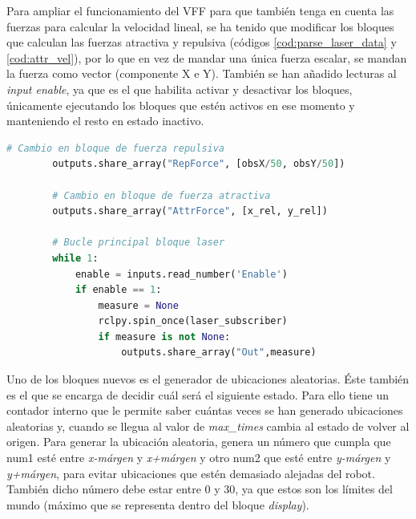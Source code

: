 Para ampliar el funcionamiento del VFF para que también tenga en cuenta las fuerzas para calcular la velocidad lineal, se ha tenido que modificar los bloques que calculan las
fuerzas atractiva y repulsiva (códigos \ref{cod:parse_laser_data} y \ref{cod:attr_vel}), por lo que en vez de mandar una única fuerza escalar, se mandan la fuerza como
vector (componente X e Y). También se han añadido lecturas al \textit{input enable}, ya que es el que habilita activar y desactivar los bloques, únicamente ejecutando
los bloques que estén activos en ese momento y manteniendo el resto en estado inactivo.

\begin{code}[H]
    \begin{lstlisting}[language=python]
        # Cambio en bloque de fuerza repulsiva
        outputs.share_array("RepForce", [obsX/50, obsY/50])

        # Cambio en bloque de fuerza atractiva
        outputs.share_array("AttrForce", [x_rel, y_rel])

        # Bucle principal bloque laser
        while 1:
            enable = inputs.read_number('Enable')
            if enable == 1:
                measure = None
                rclpy.spin_once(laser_subscriber)
                if measure is not None:
                    outputs.share_array("Out",measure)  
    \end{lstlisting}
\end{code}

Uno de los bloques nuevos es el generador de ubicaciones aleatorias. Éste también es el que se encarga de decidir cuál será el siguiente estado. Para ello tiene un contador
interno que le permite saber cuántas veces se han generado ubicaciones aleatorias y, cuando se llegua al valor de \textit{max\_times} cambia al estado de volver al origen.
Para generar la ubicación aleatoria, genera un número que cumpla que num1 esté entre \textit{x-márgen} y \textit{x+márgen} y otro num2 que esté entre \textit{y-márgen} y \textit{y+márgen},
para evitar ubicaciones que estén demasiado alejadas del robot. También dicho número debe estar entre 0 y 30, ya que estos son los límites del mundo (máximo que se
representa dentro del bloque \textit{display}).

